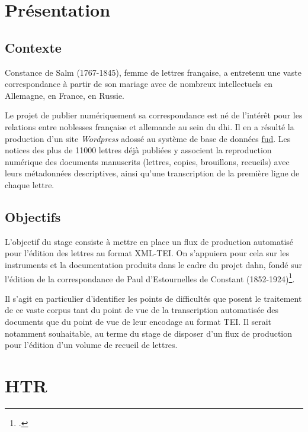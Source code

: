 \documentclass[a4paper,12pt,twoside]{book}
\begin{document}
	
	\tableofcontents
	
	\chapter*{Présentation}
	
		\section*{Contexte}
		Constance de Salm (1767-1845), femme de lettres française, a entretenu une vaste correspondance à partir de son mariage avec de nombreux intellectuels en Allemagne, en France, en Russie.

		Le projet de publier numériquement sa correspondance est né de l'intérêt pour les relations entre noblesses française et allemande au sein du \gls{dhi}. Il en a résulté la production d'un site \textit{Wordpress} adossé au système de base de données \href{https://fud.uni-trier.de/}{\gls{fud}}. Les notices des plus de 11000 lettres déjà publiées y associent la reproduction numérique des documents manuscrits (lettres, copies, brouillons, recueils) avec leurs métadonnées descriptives, ainsi qu'une transcription de la première ligne de chaque lettre.

		\section*{Objectifs}
		L'objectif du stage consiste à mettre en place un flux de production automatisé pour l'édition des lettres au format XML-TEI. On s'appuiera pour cela sur les instruments et la documentation produits dans le cadre du projet \gls{dahn}, fondé sur l'édition de la correspondance de Paul d’Estournelles de Constant (1852-1924)\footcite{chiffoleauDAHNProject}.
		
		Il s'agit en particulier d'identifier les points de difficultés que posent le traitement de ce vaste corpus tant du point de vue de la transcription automatisée des documents que du point de vue de leur encodage au format TEI. Il serait notamment souhaitable, au terme du stage de disposer d'un flux de production pour l'édition d'un volume de recueil de lettres.
			
	\chapter{HTR}
		
\end{document}
